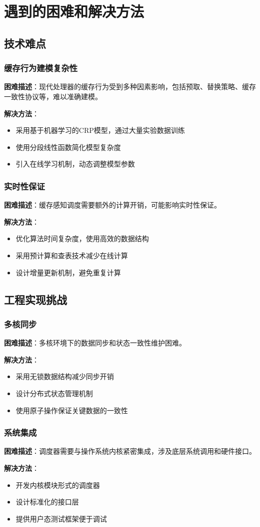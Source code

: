 
\section{遇到的困难和解决方法} \label{sec:difficulties}

\subsection{技术难点}

\subsubsection{缓存行为建模复杂性}
\textbf{困难描述}：现代处理器的缓存行为受到多种因素影响，包括预取、替换策略、缓存一致性协议等，难以准确建模。

\textbf{解决方法}：
\begin{itemize}
    \item 采用基于机器学习的CRP模型，通过大量实验数据训练
    \item 使用分段线性函数简化模型复杂度
    \item 引入在线学习机制，动态调整模型参数
\end{itemize}

\subsubsection{实时性保证}
\textbf{困难描述}：缓存感知调度需要额外的计算开销，可能影响实时性保证。

\textbf{解决方法}：
\begin{itemize}
    \item 优化算法时间复杂度，使用高效的数据结构
    \item 采用预计算和查表技术减少在线计算
    \item 设计增量更新机制，避免重复计算
\end{itemize}

\subsection{工程实现挑战}

\subsubsection{多核同步}
\textbf{困难描述}：多核环境下的数据同步和状态一致性维护困难。

\textbf{解决方法}：
\begin{itemize}
    \item 采用无锁数据结构减少同步开销
    \item 设计分布式状态管理机制
    \item 使用原子操作保证关键数据的一致性
\end{itemize}

\subsubsection{系统集成}
\textbf{困难描述}：调度器需要与操作系统内核紧密集成，涉及底层系统调用和硬件接口。

\textbf{解决方法}：
\begin{itemize}
    \item 开发内核模块形式的调度器
    \item 设计标准化的接口层
    \item 提供用户态测试框架便于调试
\end{itemize}
